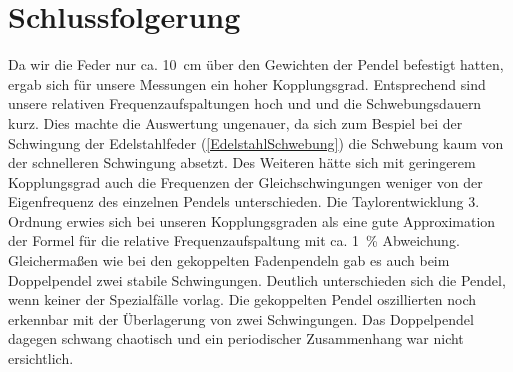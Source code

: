 \documentclass[
	a4paper,
	12pt,
	pagesize,
	ngerman
]{scrartcl}
\begin{document}
	\section{Schlussfolgerung}
	Da wir die Feder nur ca. \SI{10}{cm} über den Gewichten der Pendel befestigt hatten, ergab sich für unsere Messungen ein hoher Kopplungsgrad. Entsprechend sind unsere relativen Frequenzaufspaltungen hoch und und die Schwebungsdauern kurz.  Dies machte die Auswertung ungenauer, da sich zum Bespiel bei der Schwingung der Edelstahlfeder (\cref{EdelstahlSchwebung}) die Schwebung kaum von der schnelleren Schwingung absetzt. Des Weiteren hätte sich mit geringerem Kopplungsgrad auch die Frequenzen der Gleichschwingungen weniger von der Eigenfrequenz des einzelnen Pendels unterschieden.
	Die Taylorentwicklung 3. Ordnung erwies sich bei unseren Kopplungsgraden als eine gute Approximation der Formel für die relative Frequenzaufspaltung mit ca. \SI{1}{\%} Abweichung.
	Gleichermaßen wie bei den gekoppelten Fadenpendeln gab es auch beim Doppelpendel zwei stabile Schwingungen. Deutlich unterschieden sich die Pendel, wenn keiner der Spezialfälle vorlag. Die gekoppelten Pendel oszillierten noch erkennbar mit der Überlagerung von zwei Schwingungen. Das Doppelpendel dagegen schwang chaotisch und ein periodischer Zusammenhang war nicht ersichtlich.
	
\end{document}
